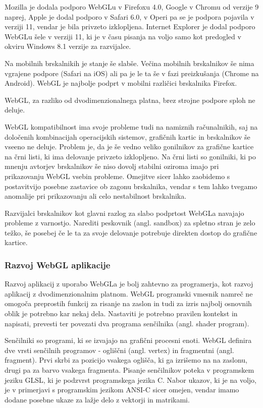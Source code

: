 Mozilla je dodala podporo WebGLu v Firefoxu 4.0, Google v Chromu od verzije 9 naprej, Apple je dodal podporo v Safari 6.0, v Operi pa se je podpora pojavila v verziji 11, vendar je bila privzeto izklopljena. Internet Explorer je dodal podporo WebGLu šele v verziji 11, ki je v času pisanja na voljo samo kot predogled v okviru Windows 8.1 verzije za razvijalce.

Na mobilnih brskalnikih je stanje še slabše. Večina mobilnih brskalnikov še nima vgrajene podpore (Safari na iOS) ali pa je le ta še v fazi preizkušanja (Chrome na Android). WebGL je najbolje podprt v mobilni različici brskalnika Firefox.

WebGL, za razliko od dvodimenzionalnega platna, brez strojne podpore sploh ne deluje. 

WebGL kompatibilnost ima svoje probleme tudi na namiznih računalnikih, saj na določenih kombinacijah operacijskih sistemov, grafičnih kartic in brskalnikov še vseeno ne deluje. Problem je, da je še vedno veliko gonilnikov za grafične kartice na črni listi, ki ima delovanje privzeto izklopljeno. Na črni listi so gonilniki, ki po mnenju avtorjev brskalnikov še niso dovolj stabilni oziroma imajo pri prikazovanju WebGL vsebin probleme. Omejitve sicer lahko zaobidemo s postavitvijo posebne zastavice ob zagonu brskalnika, vendar s tem lahko tvegamo anomalije pri prikazovanju ali celo nestabilnost brskalnika.

Razvijalci brskalnikov kot glavni razlog za slabo podprtost WebGLa navajajo probleme z varnostjo. Narediti peskovnik (angl. sandbox) za spletno stran je zelo težko, še posebej če le ta za svoje delovanje potrebuje direkten dostop do grafične kartice.

\subsubsection{Razvoj WebGL aplikacije}

Razvoj aplikacij z uporabo WebGLa je bolj zahtevno za programerja, kot razvoj aplikacij z dvodimenzionalnim platnom. WebGL programski vmesnik namreč ne omogoča preprostih funkcij za risanje na zaslon in tudi za izris najbolj osnovnih oblik je potrebno kar nekaj dela. Nastaviti je potrebno pravilen kontekst in napisati, prevesti ter povezati dva programa senčilnika (angl. shader program). 

Senčilniki so programi, ki se izvajajo na grafični procesni enoti. WebGL definira dve vrsti senčilnih programov - ogliščni (angl. vertex) in fragmentni (angl. fragment). Prvi skrbi za pozicijo vsakega oglišča, ki ga izrišemo na na zaslonu, drugi pa za barvo vsakega fragmenta. Pisanje senčilnikov poteka v programskem jeziku GLSL, ki je podzvrst programskega jezika C. Nabor ukazov, ki je na voljo, je v primerjavi s programskim jezikom ANSI-C sicer omejen, vendar imamo dodane posebne ukaze za lažje delo z vektorji in matrikami.

